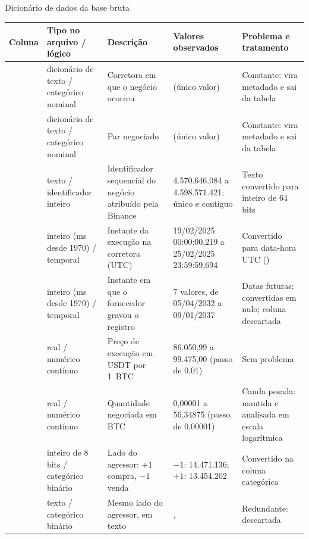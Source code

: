 \begin{quadro}[htbp]
\caption{\label{qua:dicionario}Dicionário de dados da base bruta}
\begin{corpotabela}
\begin{tabularx}{\textwidth}{|L{2.3cm}|L{2.2cm}|Y|L{3.4cm}|L{3.1cm}|}
\hline
\textbf{Coluna} & \textbf{Tipo no arquivo / lógico} & \textbf{Descrição} & \textbf{Valores observados} & \textbf{Problema e tratamento} \\ \hline
{} & dicionário de texto / categórico nominal & Corretora em que o negócio ocorreu &  (único valor) & Constante: vira metadado e sai da tabela \\ \hline
{} & dicionário de texto / categórico nominal & Par negociado &  (único valor) & Constante: vira metadado e sai da tabela \\ \hline
{} & texto / identificador inteiro & Identificador sequencial do negócio atribuído pela Binance & 4.570.646.084 a 4.598.571.421; único e contíguo & Texto convertido para inteiro de 64 bits \\ \hline
{} & inteiro (ms desde 1970) / temporal & Instante da execução na corretora (UTC) & 19/02/2025 00:00:00,219 a 25/02/2025 23:59:59,694 & Convertido para data-hora UTC () \\ \hline
{} & inteiro (ms desde 1970) / temporal & Instante em que o fornecedor gravou o registro & 7 valores, de 05/04/2032 a 09/01/2037 & Datas futuras: convertidas em nulo; coluna descartada \\ \hline
{} & real / numérico contínuo & Preço de execução em USDT por 1~BTC & 86.050,99 a 99.475,00 (passo de 0,01) & Sem problema \\ \hline
{} & real / numérico contínuo & Quantidade negociada em BTC & 0,00001 a 56,34875 (passo de 0,00001) & Cauda pesada: mantida e analisada em escala logarítmica \\ \hline
{} & inteiro de 8 bits / categórico binário & Lado do agressor: $+1$ compra, $-1$ venda & $-1$: 14.471.136; $+1$: 13.454.202 & Convertido na coluna categórica  \\ \hline
{} & texto / categórico binário & Mesmo lado do agressor, em texto & ,  & Redundante: descartada \\ \hline
\end{tabularx}
\end{corpotabela}
\fonteautores[Elaborado]
\end{quadro}


